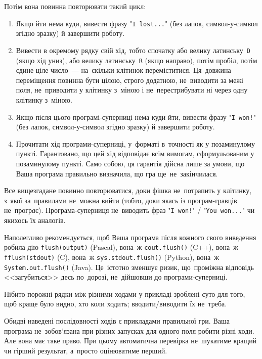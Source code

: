 Потім вона повинна повторювати такий цикл:
\begin{enumerate}
\item
Якщо йти нема куди, вивести фразу "\texttt{I~lost...}" (без лапок, символ-у-символ згідно зразку) й завершити роботу.
\item
Вивести в окремому рядку свій хід, тобто спочатку або велику латинську~\texttt{D} (якщо хід униз), або велику латинську~\texttt{R} (якщо направо), потім пробіл, потім єдине ціле число~--- на~скільки клітинок переміститися. Ця~довжина переміщення повинна бути цілою, строго додатною, не~виводити за межі п{\it о}ля, не~приводити у клітинку з~міною і не~перестрибувати ні через одну клітинку з~міною.
\item
Якщо після цього програмі-суперниці нема куди йти, вивести фразу "\texttt{I~won!}" (без лапок, символ-у-символ згідно зразку) й завершити роботу.
\item
Прочитати хід програми-суперниці, у~форматі в~точності як у позаминулому пункті. Гарантовано, що цей хід відповідає всім вимогам, сформульованим у позаминулому пункті. Само собою, ця гарантія дійсна лише за умови, що Ваша програма правильно визначила, що гра ще~не~закінчилася.
\end{enumerate}
Все вищезгадане повинно повторюватися, доки фішка не~потрапить у клітинку, з~якої за~правилами не~можна вийти (тобто, доки якась із програм-гравців не~прогр{\it а}є).
Програма-суперниця не~виводить фраз "\texttt{I~won!}" / "\texttt{You~won...}" 
чи якихось їх аналогів.

Наполегливо рекомендується, щоб Ваша програма після кожного свого виведення 
робила дію {\tt flush(output)} (Pascal), 
вона~ж {\tt cout.flush()} (C++), 
вона~ж {\tt fflush(stdout)} (C), 
вона~ж {\tt sys.stdout.flush()} (Python),
вона~ж {\tt System.out.flush()} (Java).
Це~істотно зменшує ризик, 
що~проміжна відповідь <<загубиться>> десь по~дорозі, 
не~дійшовши до програми-суперниці.


\Examples

\begin{example}
%
%
\end{example}


\Note

Нібито порожні рядки між різними ходами у прикладі зроблені суто для того, щоб краще було видно, хто коли ходить; вводити/виводити їх не~треба.

Обидві наведені послідовності ходів є прикладами правильної гри.
Ваша програма не~зобов'язана при різних запусках для одного поля робити різні ходи. 
Але вона має таке право.
При цьому
автоматична перевірка не~шукатиме кращий чи гірший результат, а~просто оцінюватиме перший.


